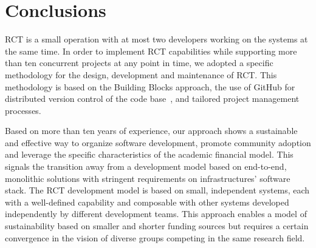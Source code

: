 \documentclass[preprint,12pt, a4paper]{elsarticle}
\begin{document}
\section{Conclusions}\label{sec:conclusions}

RCT is a small operation with at most two developers working on the systems at
the same time. In order to implement RCT capabilities while supporting more than
ten concurrent projects at any point in time, we adopted a specific methodology
for the design, development and maintenance of RCT\@. This methodology is based
on the Building Blocks approach, the use of GitHub for distributed version
control of the code base~\cite{github-rct}, and tailored project management
processes.

Based on more than ten years of experience, our approach shows a sustainable and
effective way to organize software development, promote community adoption and
leverage the specific characteristics of the academic financial model. This
signals the transition away from a development model based on end-to-end,
monolithic solutions with stringent requirements on infrastructures' software
stack. The RCT development model is based on small, independent systems, each
with a well-defined capability and composable with other systems developed
independently by different development teams. This approach enables a model of
sustainability based on smaller and shorter funding sources but requires a
certain convergence in the vision of diverse groups competing in the same
research field.

\end{document}
